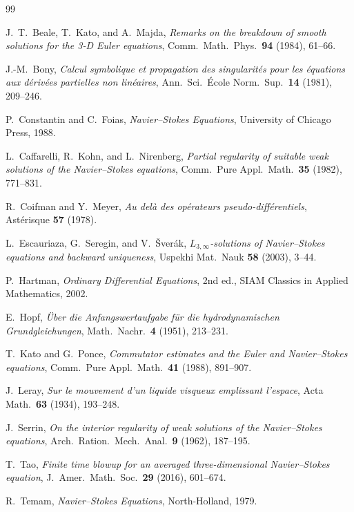 \documentclass[12pt]{amsart}
\theoremstyle{remark}
\begin{document}
\begin{thebibliography}{99}

J.~T.~Beale, T.~Kato, and A.~Majda,
\textit{Remarks on the breakdown of smooth solutions for the 3-D Euler
equations},
Comm.\ Math.\ Phys.\ \textbf{94} (1984), 61--66.

J.-M.~Bony,
\textit{Calcul symbolique et propagation des singularit\'es pour les
\'equations aux d\'eriv\'ees partielles non lin\'eaires},
Ann.\ Sci.\ \'Ecole Norm.\ Sup.\ \textbf{14} (1981), 209--246.

P.~Constantin and C.~Foias,
\textit{Navier--Stokes Equations},
University of Chicago Press, 1988.

L.~Caffarelli, R.~Kohn, and L.~Nirenberg,
\textit{Partial regularity of suitable weak solutions of the
Navier--Stokes equations},
Comm.\ Pure Appl.\ Math.\ \textbf{35} (1982), 771--831.

R.~Coifman and Y.~Meyer,
\textit{Au del\`a des op\'erateurs pseudo-diff\'erentiels},
Ast\'erisque \textbf{57} (1978).

L.~Escauriaza, G.~Seregin, and V.~\v{S}ver\'ak,
\textit{$L_{3,\infty}$-solutions of Navier--Stokes equations and
backward uniqueness},
Uspekhi Mat.\ Nauk \textbf{58} (2003), 3--44.

P.~Hartman,
\textit{Ordinary Differential Equations},
2nd ed., SIAM Classics in Applied Mathematics, 2002.

E.~Hopf,
\textit{\"Uber die Anfangswertaufgabe f\"ur die hydrodynamischen
Grundgleichungen},
Math.\ Nachr.\ \textbf{4} (1951), 213--231.

T.~Kato and G.~Ponce,
\textit{Commutator estimates and the Euler and Navier--Stokes equations},
Comm.\ Pure Appl.\ Math.\ \textbf{41} (1988), 891--907.

J.~Leray,
\textit{Sur le mouvement d'un liquide visqueux emplissant l'espace},
Acta Math.\ \textbf{63} (1934), 193--248.

J.~Serrin,
\textit{On the interior regularity of weak solutions of the
Navier--Stokes equations},
Arch.\ Ration.\ Mech.\ Anal.\ \textbf{9} (1962), 187--195.

T.~Tao,
\textit{Finite time blowup for an averaged three-dimensional
Navier--Stokes equation},
J.\ Amer.\ Math.\ Soc.\ \textbf{29} (2016), 601--674.

R.~Temam,
\textit{Navier--Stokes Equations},
North-Holland, 1979.

\end{thebibliography}
\end{document}
